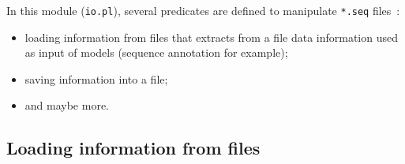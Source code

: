 \documentclass{book}
\begin{document}
In this module (\texttt{io.pl}), several predicates are defined to
manipulate \texttt{*.seq} files~:
\begin{itemize}
\item loading information from files that extracts from a file data
  information used as input of models (sequence annotation for
  example);
\item saving information into a file;
\item and maybe more. 
\end{itemize}

\subsection{Loading information from files}

\end{document}
